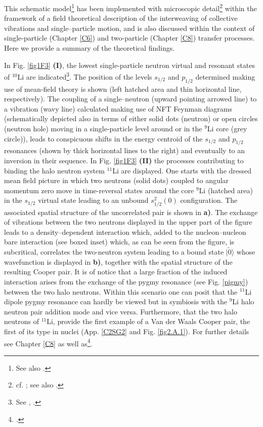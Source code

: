  
 
 This schematic model\footnote{See also \cite{Broglia:19b}.} has been implemented with microscopic detail\footnote{cf. \cite{Barranco:01}; see also \cite{Potel:10}.} within the framework of a field theoretical description of the interweaving of collective vibrations and single--particle motion, and is also discussed  within the context of single-particle (Chapter \ref{C6}) and two-particle (Chapter \ref{C8}) transfer processes. Here we provide a summary of the theoretical findings. 
 
 
 
 
 In Fig. \ref{fig1F3} \textbf{(I)}, the lowest single-particle neutron virtual and resonant states of  $^{10}$Li are indicated\footnote{See \cite{Barranco:20}, \cite{Moro:19}.}. The 
  position of the levels $s_{1/2}$ and $p_{1/2}$ determined making use
 of mean-field theory is shown (left hatched area and thin horizontal
 line, respectively). The coupling of a single--neutron (upward
 pointing arrowed line) to a vibration (wavy line) calculated
 making use of NFT Feynman diagrams 
 (schematically depicted also in terms of either solid dots (neutron)
 or open circles (neutron hole) moving in a single-particle
 level around or in the $^9$Li core (grey circle)), leads to conspicuous
 shifts in the energy centroid of the $s_{1/2}$ and $p_{1/2}$ resonances
 (shown by thick horizontal lines to the right) and eventually to
 an inversion in their sequence. In Fig. \ref{fig1F3} \textbf{(II)} the  processes contributing to  binding the  halo neutron system $^{11}$Li are displayed. One starts with the dressed mean  field
 picture in which two neutrons (solid dots) coupled to angular momentum zero move in
 time-reversal states around the core $^{9}$Li (hatched area) in the
 $s_{1/2}$ virtual state leading to an unbound $s^2
 _{1/2}(0)$ configuration.  The associated spatial structure of the uncorrelated pair is shown in \textbf{a)}. The exchange
 of vibrations between the two neutrons displayed in the upper
 part of the figure leads to a density--dependent interaction
 which, added to the nucleon--nucleon bare interaction (see boxed inset) which, as can be seen from the figure, is subcritical, correlates the
 two-neutron system leading to a bound state $|\tilde 0\rangle$ whose wavefunction is  displayed in \textbf{b)}, together with the spatial structure of the resulting Cooper pair. It is of notice that a large fraction of the induced interaction arises from the exchange of the pygmy resonance (see Fig. \ref{pigmy}) between the two halo neutrons.  Within this scenario one can posit that the $^{11}$Li dipole pygmy resonance can hardly be viewed but in symbiosis with the $^{9}$Li halo neutron pair addition mode and vice versa. Furthermore, that the two halo neutrons of $^{11}$Li, provide the first example of a Van der Waals Cooper pair, the first of its type in nuclei (App. \ref{C2SG2} and Fig. \ref{fig2.A.1}). For further details see Chapter \ref{C8} as well as\footnote{\cite{Barranco:01}.}.
 
